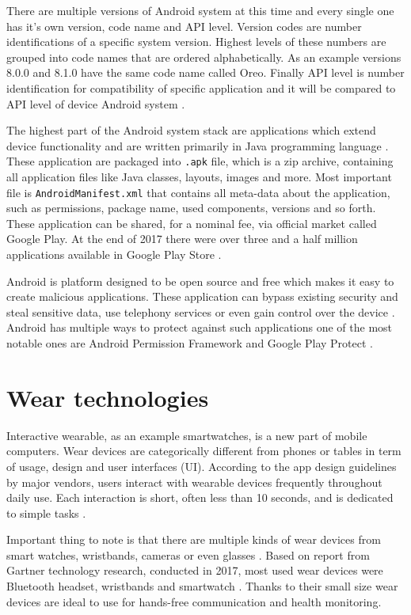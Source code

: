 There are multiple versions of Android system at this time and every single one has it's own version, code name and API level. Version codes are number identifications of a specific system version. Highest levels of these numbers are grouped into code names that are ordered alphabetically. As an example versions 8.0.0 and 8.1.0 have the same code name called Oreo. Finally API level is number identification for compatibility of specific application and it will be compared to API level of device Android system \cite{AOSP, AD}.

The highest part of the Android system stack are applications which extend device functionality and are written primarily in Java programming language \cite{SoASTaD}. These application are packaged into \verb|.apk| file, which is a zip archive, containing all application files like Java classes, layouts, images and more. Most important file is \verb|AndroidManifest.xml| that contains all meta-data about the application, such as permissions, package name, used components, versions and so forth. These application can be shared, for a nominal fee, via official market called Google Play. At the end of 2017 there were over three and a half million applications available in Google Play Store \cite{SoASTaD, NoAAiGPS, NoAA}.

Android is platform designed to be open source and free which makes it easy to create malicious applications. These application can bypass existing security and steal sensitive data, use telephony services or even gain control over the device \cite{ASIMPD}. Android has multiple ways to protect against such applications one of the most notable ones are Android Permission Framework and Google Play Protect \cite{SoASTaD}.


\section{Wear technologies}\label{sec:WearTechnologies}
Interactive wearable, as an example smartwatches, is a new part of mobile computers. Wear devices are categorically different from phones or tables in term of usage, design and user interfaces (UI). According to the app design guidelines by major vendors, users interact with wearable devices frequently throughout daily use. Each interaction is short, often less than 10 seconds, and is dedicated to simple tasks \cite{UtCoAWO}. 

Important thing to note is that there are multiple kinds of wear devices from smart watches, wristbands, cameras or even glasses \cite{MIWD}. Based on report from Gartner technology research, conducted in 2017, most used wear devices were Bluetooth headset, wristbands and smartwatch \cite{GSWWDS}. Thanks to their small size wear devices are ideal to use for hands-free communication and health monitoring.

